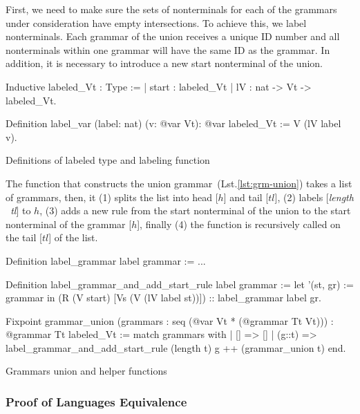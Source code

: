 First, we need to make sure the sets of nonterminals for each of the grammars under consideration have empty intersections. To achieve this, we label nonterminals. Each grammar of the union receives a unique ID number and all nonterminals within one grammar will have the same ID as the grammar. In addition, it is necessary to introduce a new start nonterminal of the union.

\begin{listing}[h]
    \begin{pyglist}[language=coq, numbers=none, numbersep=5pt]
  Inductive labeled_Vt : Type :=
  | start : labeled_Vt
  | lV : nat -> Vt -> labeled_Vt.
  
  Definition label_var (label: nat) 
                       (v: @var Vt): @var 
                       labeled_Vt :=
    V (lV label v).  
    \end{pyglist}
    \caption{Definitions of labeled type and labeling function}
    \label{lst:verbments1}
\end{listing}

The function that constructs the union grammar~(Lst.\ref{lst:grm-union}) takes a list of grammars, then, it (1) splits the list into head [$h$] and tail [$tl$], (2) labels [\textit{length \ tl}] to $h$, (3) adds a new rule from the start nonterminal of the union to the start nonterminal of the grammar [$h$], finally (4) the function is recursively called on the tail [$tl$] of the list.

\begin{listing}[h]
    \begin{pyglist}[language=coq, numbers=none, numbersep=5pt]
  Definition label_grammar label grammar := ...

  Definition label_grammar_and_add_start_rule 
               label 
               grammar :=
    let '(st, gr) := grammar in 
    (R (V start) [Vs (V (lV label st))]) 
       :: label_grammar label gr.        

  Fixpoint grammar_union 
     (grammars : seq (@var Vt * (@grammar Tt Vt)))
       : @grammar 
     Tt 
     labeled_Vt :=
    match grammars with
    |  [] => []
    |  (g::t) => 
         label_grammar_and_add_start_rule 
           (length t) 
           g ++ (grammar_union t)
    end.
    \end{pyglist}
    \caption{Grammars union and helper functions}
    \label{lst:grm-union}
\end{listing}

\subsubsection{Proof of Languages Equivalence}

